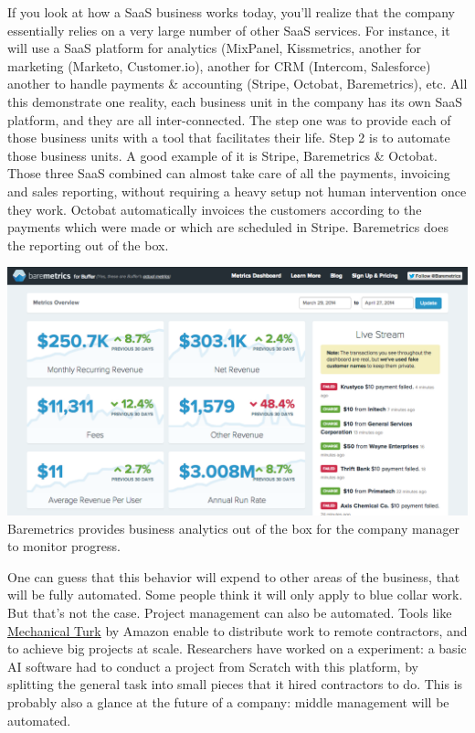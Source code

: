 \documentclass[12pt]{article}
\begin{document}
If you look at how a SaaS business works today, you'll realize that the company essentially relies on a very large number of other SaaS services. For instance, it will use a SaaS platform for analytics (MixPanel, Kissmetrics, another for marketing (Marketo, Customer.io), another for CRM (Intercom, Salesforce) another to handle payments \& accounting (Stripe, Octobat, Baremetrics), etc.
All this demonstrate one reality, each business unit in the company has its own SaaS platform, and they are all inter-connected. The step one was to provide each of those business units with a tool that facilitates their life. Step 2 is to automate those business units. A good example of it is Stripe, Baremetrics \& Octobat. Those three SaaS combined can almost take care of all the payments, invoicing and sales reporting, without requiring a heavy setup not human intervention once they work. Octobat automatically invoices the customers according to the payments which were made or which are scheduled in Stripe. Baremetrics does the reporting out of the box.

\smallskip
\includegraphics[width=\textwidth]{baremetrics}
Baremetrics provides business analytics out of the box for the company manager to monitor progress.

\smallskip

One can guess that this behavior will expend to other areas of the business, that will be fully automated. Some people think it will only apply to blue collar work. But that's not the case. Project management can also be automated. Tools like \href{https://www.mturk.com/mturk/welcome}{Mechanical Turk} by Amazon enable to distribute work to remote contractors, and to achieve big projects at scale. Researchers have worked on a experiment: a basic AI software had to conduct a project from Scratch with this platform, by splitting the general task into small pieces that it hired contractors to do. This is probably also a glance at the future of a company: middle management will be automated.
\end{document}
